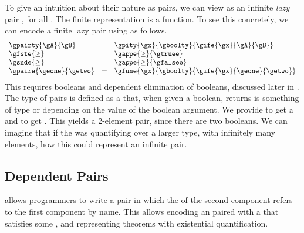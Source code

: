 {\begin{digression}
To give an intuition about their nature as pairs, we can view  \im{\gpity{\gx}{\gA}{\gB}} as an infinite \emph{lazy} pair
, for all \im{\gxi : \gA}.
The finite representation is a function.
To see this concretely, we can encode a finite lazy pair using  as follows.
\begin{displaymath}
  \begin{array}{lll}
    \gpairty{\gA}{\gB} &=& \gpity{\gx}{\gboolty}{\gife{\gx}{\gA}{\gB}} \\
    \gfste{\ge} &=& \gappe{\ge}{\gtruee} \\
    \gsnde{\ge} &=& \gappe{\ge}{\gfalsee}  \\
    \gpaire{\geone}{\getwo} &=& \gfune{\gx}{\gboolty}{\gife{\gx}{\geone}{\getwo}} \\
  \end{array}
\end{displaymath}
This requires booleans and dependent elimination of booleans, discussed later in
.
The type of pairs \im{\gpairty{\gA}{\gB}} is defined as a  that, when given a boolean, returns is something of type \im{\gA} or
\im{\gB} depending on the value of the boolean argument.
We provide \im{\gtruee} to get a \im{\gA} and \im{\gfalsee} to get \im{\gB}.
This yields a 2-element pair, since there are two booleans.
We can imagine that if the  was quantifying over a
larger type, with infinitely many elements, how this could represent an infinite
pair.
\end{digression}

\subsection{Dependent Pairs}
 allows programmers to write a pair in which the
 of the second component refers to the first component by name.
This allows encoding an  \im{\se} paired with a 
\im{\se} that satisfies some , and representing theorems
with existential quantification.

}

